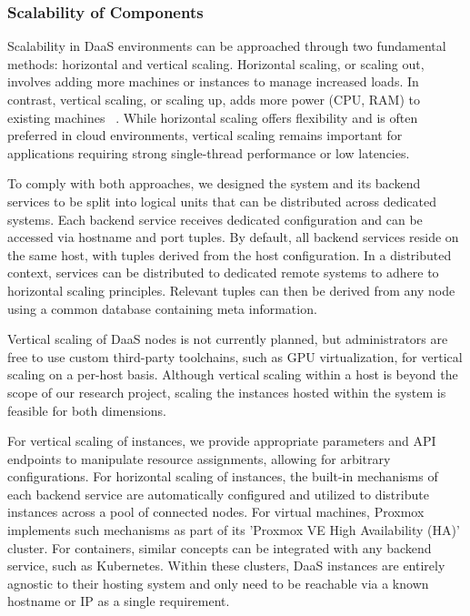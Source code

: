 \documentclass[runningheads]{llncs}
\begin{document}
\subsubsection{Scalability of Components}

Scalability in DaaS environments
can be approached through two fundamental methods: horizontal and vertical scaling.
Horizontal scaling, or scaling out, involves adding more machines or instances
to manage increased loads.
In contrast, vertical scaling, or scaling up,
adds more power (CPU, RAM) to existing machines
~\cite{vaquero2011dynamically}.
While horizontal scaling offers flexibility
and is often preferred in cloud environments,
vertical scaling remains important for applications
requiring strong single-thread performance or low latencies.

To comply with both approaches,
we designed the system and its backend services
to be split into logical units that can be distributed across dedicated systems.
Each backend service receives dedicated configuration
and can be accessed via hostname and port tuples.
By default, all backend services reside on the same host,
with tuples derived from the host configuration.
In a distributed context, services can be distributed to dedicated remote systems
to adhere to horizontal scaling principles.
Relevant tuples can then be derived from any node
using a common database containing meta information.

Vertical scaling of DaaS nodes is not currently planned,
but administrators are free to use custom third-party toolchains,
such as GPU virtualization, for vertical scaling on a per-host basis.
Although vertical scaling within a host is beyond the scope of our research project,
scaling the instances hosted within the system is feasible for both dimensions.

For vertical scaling of instances, we provide appropriate parameters
and API endpoints to manipulate resource assignments,
allowing for arbitrary configurations.
For horizontal scaling of instances, the built-in mechanisms
of each backend service are automatically configured
and utilized to distribute instances across a pool of connected nodes.
For virtual machines, Proxmox implements such mechanisms
as part of its 'Proxmox VE High Availability (HA)' cluster.
For containers, similar concepts can be integrated with any backend service,
such as Kubernetes.
Within these clusters,
DaaS instances are entirely agnostic to their hosting system
and only need to be reachable via a known hostname or IP as a single requirement.
\end{document}
